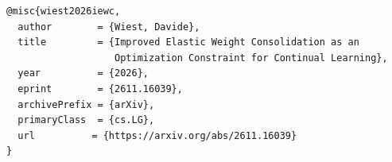 \documentclass[11pt]{article}
\begin{document}
\makepublicationlinks

\begin{publicationcitation}
\begin{verbatim}
@misc{wiest2026iewc,
  author        = {Wiest, Davide},
  title         = {Improved Elastic Weight Consolidation as an
                   Optimization Constraint for Continual Learning},
  year          = {2026},
  eprint        = {2611.16039},
  archivePrefix = {arXiv},
  primaryClass  = {cs.LG},
  url          = {https://arxiv.org/abs/2611.16039}
}
\end{verbatim}
\end{publicationcitation}
\end{document}
